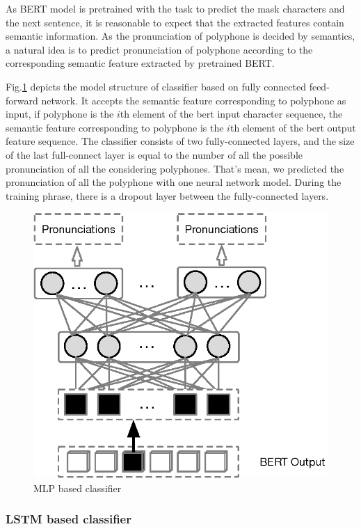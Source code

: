 \documentclass[a4paper]{article}
\begin{document}
As BERT model is pretrained with the task to predict the mask characters and the next sentence, it is reasonable to expect that the extracted features contain semantic information. As the pronunciation of polyphone is decided by semantics, a natural idea is to predict pronunciation of polyphone according to the corresponding semantic feature extracted by pretrained BERT.

Fig.\ref{fig:mlp} depicts the model structure of classifier based on fully connected feed-forward network. It accepts the semantic feature corresponding to polyphone as input, if polyphone is the $i$th element of the bert input character sequence, the semantic feature corresponding to polyphone is the $i$th element of the bert output feature sequence. The classifier consists of two fully-connected layers, and the size of the last full-connect layer is equal to the number of all the possible pronunciation of all the considering polyphones. That's mean, we predicted the pronunciation of all the polyphone with one neural network model. During the training phrase, there is a dropout layer between the fully-connected layers.

\begin{figure}[t]
	\centering
	\includegraphics[scale=0.5]{pics/FC2.eps}
	\caption{MLP based classifier}
	\label{fig:mlp}
\end{figure}

\subsubsection{LSTM based classifier}
\label{sssec: lstm_based_classifier}
\end{document}

